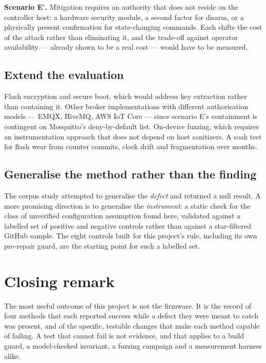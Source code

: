 \textbf{Scenario E$'$.} Mitigation requires an authority that does not reside on the controller
host: a hardware security module, a second factor for disarm, or a physically present
confirmation for state-changing commands. Each shifts the cost of the attack rather than
eliminating it, and the trade-off against operator availability --- already shown to be a real
cost --- would have to be measured.

\subsection{Extend the evaluation}

Flash encryption and secure boot, which would address key extraction rather than containing it.
Other broker implementations with different authorisation models --- EMQX, HiveMQ, AWS IoT Core
--- since scenario E's containment is contingent on Mosquitto's deny-by-default list. On-device
fuzzing, which requires an instrumentation approach that does not depend on host sanitizers. A
soak test for flash wear from counter commits, clock drift and fragmentation over months.

\subsection{Generalise the method rather than the finding}

The corpus study attempted to generalise the \emph{defect} and returned a null result. A more
promising direction is to generalise the \emph{instrument}: a static check for the class of
unverified configuration assumption found here, validated against a labelled set of positive and
negative controls rather than against a star-filtered GitHub sample. The eight controls built for
this project's rule, including its own pre-repair guard, are the starting point for such a
labelled set.

\section{Closing remark}

The most useful outcome of this project is not the firmware. It is the record of four methods
that each reported success while a defect they were meant to catch was present, and of the
specific, testable changes that make each method capable of failing. A test that cannot fail is
not evidence, and that applies to a build guard, a model-checked invariant, a fuzzing campaign and
a measurement harness alike.
